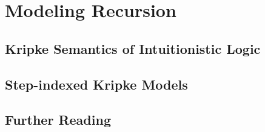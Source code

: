 \chapter{Modeling Recursion}

\section{Kripke Semantics of Intuitionistic Logic}

\section{Step-indexed Kripke Models}

\section{Further Reading}
